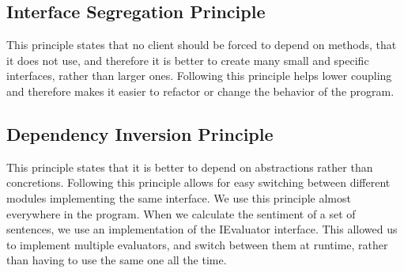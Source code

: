 \subsection{Interface Segregation Principle}
This principle states that no client should be forced to depend on methods, that it does not use, and therefore it is better to create many small and specific interfaces, rather than larger ones. Following this principle helps lower coupling and therefore makes it easier to refactor or change the behavior of the program. 

\subsection{Dependency Inversion Principle}
This principle states that it is better to depend on abstractions rather than concretions. Following this principle allows for easy switching between different modules implementing the same interface. We use this principle almost everywhere in the program. When we calculate the sentiment of a set of sentences, we use an implementation of the IEvaluator interface. This allowed us to implement multiple evaluators, and switch between them at runtime, rather than having to use the same one all the time.
